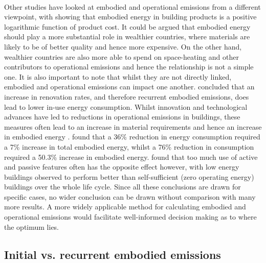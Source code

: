 \documentclass[12pt]{article}
\begin{document}
\paragraph{}
Other studies have looked at embodied and operational emissions from a different viewpoint, with \citet{Copiello2017-hm} showing that embodied energy in building products is a positive logarithmic function of product cost. It could be argued that embodied energy should play a more substantial role in wealthier countries, where materials are likely to be of better quality and hence more expensive. On the other hand, wealthier countries are also more able to spend on space-heating and other contributors to operational emissions and hence the relationship is not a simple one. It is also important to note that whilst they are not directly linked, embodied and operational emissions can impact one another. \citet{Filchakova2009-zi} concluded that an increase in renovation rates, and therefore recurrent embodied emissions, does lead to lower in-use energy consumption. Whilst innovation and technological advances have led to reductions in operational emissions in buildings, these measures often lead to an increase in material requirements and hence an increase in embodied energy \citep{Ibn-Mohammed2013-wu}. \citet{Seo2017-uk} found that a 36\% reduction in energy consumption required a 7\% increase in total embodied energy, whilst a 76\% reduction in consumption required a 50.3\% increase in embodied energy. \citet{Ramesh2010-wc} found that too much use of active and passive features often has the opposite effect however, with low energy buildings observed to perform better than self-sufficient (zero operating energy) buildings over the whole life cycle. Since all these conclusions are drawn for specific cases, no wider conclusion can be drawn without comparison with many more results. A more widely applicable method for calculating embodied and operational emissions would facilitate well-informed decision making as to where the optimum lies. 

\subsection{Initial vs. recurrent embodied emissions}
\label{InitialVsEmbodied}
\end{document}

